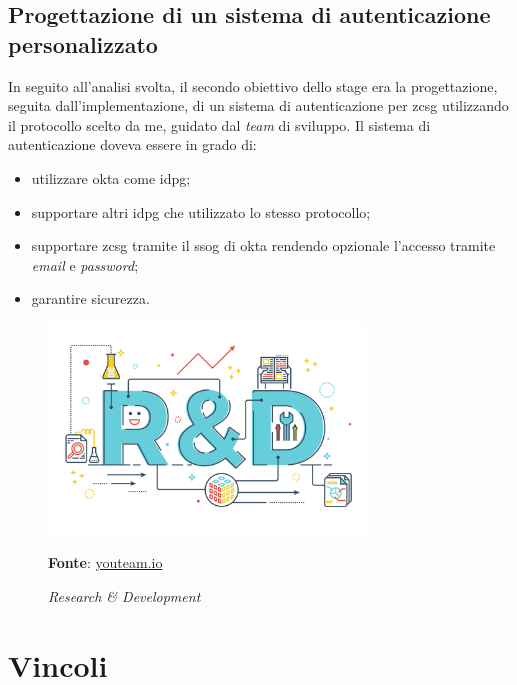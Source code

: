     \subsection{Progettazione di un sistema di autenticazione personalizzato}
        In seguito all'analisi svolta, il secondo obiettivo dello stage era la progettazione, seguita dall'implementazione, di un sistema di autenticazione per \gls{zcsg} utilizzando il protocollo scelto da me, guidato dal \textit{team} di sviluppo. Il sistema di autenticazione doveva essere in grado di:
        \begin{itemize}
            \setlength\itemsep{0em}
            \item utilizzare \gls{okta} come \gls{idpg};
            \item supportare altri \gls{idpg} che utilizzato lo stesso protocollo;
            \item supportare \gls{zcsg} tramite il \gls{ssog} di \gls{okta} rendendo opzionale l'accesso tramite \textit{email} e \textit{password};
            \item garantire sicurezza.
        \end{itemize}
    \begin{figure}[ht]
        \centering
        \includegraphics[width=0.75\textwidth]{immagini/rd.jpg}
        \caption{\textit{Research \& Development}}
        \textbf{Fonte}:
        \href{https://youteam.io/blog/research-and-development-the-fourth-pillar-of-software-development/}{youteam.io}
        \label{fig: Research & Development}
    \end{figure}

\section{Vincoli}
